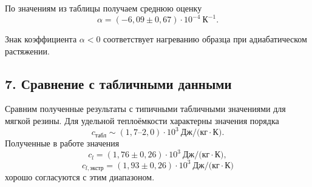 \documentclass[12pt,a4paper]{article}
\numberwithin{equation}{section}
\newcommand{\compactTableStyle}{%
    \footnotesize
    \renewcommand{\arraystretch}{1.15}%
}
\begin{document}
\begin{table}[H]
    \centering
    \caption{Оценка коэффициента теплового расширения}
    \compactTableStyle
\end{table}

По значениям из таблицы получаем среднюю оценку
\[
    \boxed{
        \alpha
        =
        (-6{,}09\pm0{,}67)\cdot10^{-4}\ \text{К}^{-1}
    }.
\]

Знак коэффициента $\alpha<0$ соответствует нагреванию образца при адиабатическом растяжении.

\subsection*{7. Сравнение с табличными данными}

Сравним полученные результаты с типичными табличными значениями для мягкой резины.
Для удельной теплоёмкости характерны значения порядка
\[
    c_{\text{табл}} \sim (1{,}7\text{--}2{,}0)\cdot10^3\ \text{Дж/(кг}\cdot\text{К)}.
\]
Полученные в работе значения
\[
    c_l=(1{,}76\pm0{,}26)\cdot10^3\ \text{Дж/(кг}\cdot\text{К)},
\]
\[
    c_{l,\text{экстр}}=(1{,}93\pm0{,}26)\cdot10^3\ \text{Дж/(кг}\cdot\text{К)}
\]
хорошо согласуются с этим диапазоном.
\end{document}
